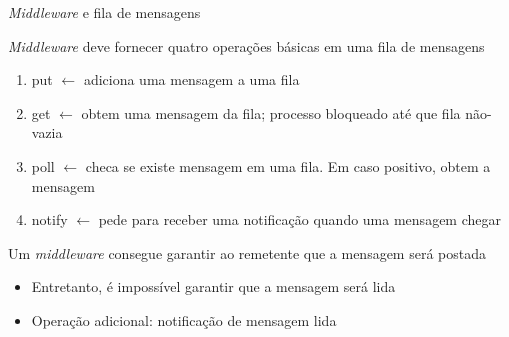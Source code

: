 \documentclass[compress]{beamer}
\begin{document}

\begin{frame}{\textit{Middleware} e fila de mensagens}

\textit{Middleware} deve fornecer quatro operações básicas em uma fila de mensagens

\begin{enumerate}
    \item put \textcolor{sthlmDarkBlue}{$\leftarrow$} adiciona uma mensagem a uma fila
    \item get \textcolor{sthlmDarkBlue}{$\leftarrow$} obtem uma mensagem da fila; processo bloqueado até que fila não-vazia
    \item poll \textcolor{sthlmDarkBlue}{$\leftarrow$} checa se existe mensagem em uma fila. Em caso positivo, obtem a mensagem
    \item notify \textcolor{sthlmDarkBlue}{$\leftarrow$} pede para receber uma notificação quando uma mensagem chegar
\end{enumerate}

\vspace{0.5cm}

Um \textit{middleware} consegue garantir ao remetente que a mensagem será postada
\begin{itemize}
    \item Entretanto, é impossível garantir que a mensagem será lida
    \item Operação adicional: notificação de mensagem lida
\end{itemize}
\end{frame}

\end{document}
